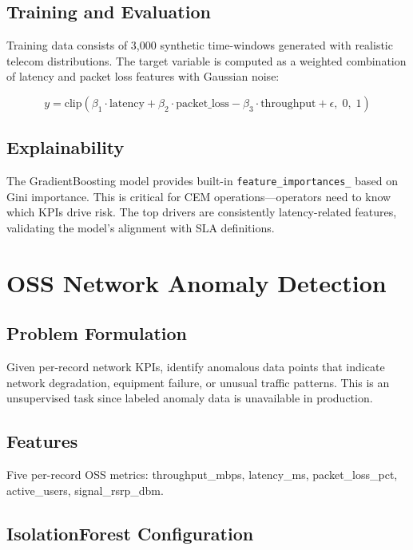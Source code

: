 \subsection{Training and Evaluation}

Training data consists of 3,000 synthetic time-windows generated with realistic telecom distributions. The target variable is computed as a weighted combination of latency and packet loss features with Gaussian noise:

\[
y = \text{clip}\left(\beta_1 \cdot \text{latency} + \beta_2 \cdot \text{packet\_loss} - \beta_3 \cdot \text{throughput} + \epsilon, \; 0, \; 1\right)
\]

\subsection{Explainability}

The GradientBoosting model provides built-in \texttt{feature\_importances\_} based on Gini importance. This is critical for CEM operations---operators need to know which KPIs drive risk. The top drivers are consistently latency-related features, validating the model's alignment with SLA definitions.

\section{OSS Network Anomaly Detection}

\subsection{Problem Formulation}

Given per-record network KPIs, identify anomalous data points that indicate network degradation, equipment failure, or unusual traffic patterns. This is an unsupervised task since labeled anomaly data is unavailable in production.

\subsection{Features}

Five per-record OSS metrics: throughput\_mbps, latency\_ms, packet\_loss\_pct, active\_users, signal\_rsrp\_dbm.

\subsection{IsolationForest Configuration}

